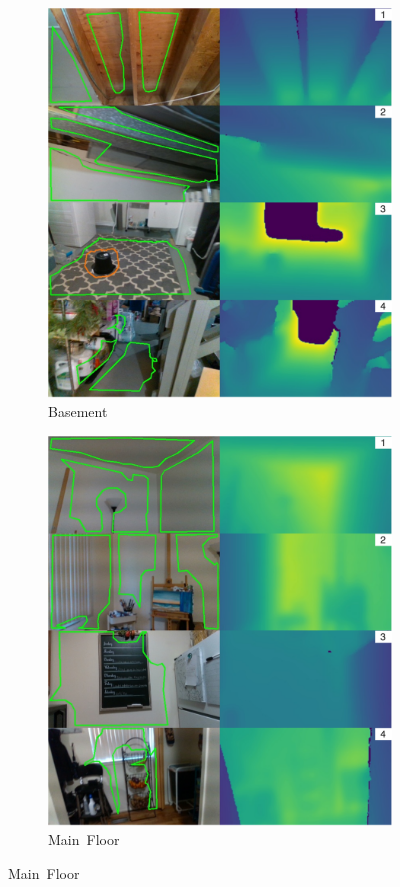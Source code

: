 \begin{figure}[ht]

  \begin{subfigure}[t]{.48\linewidth}
    \centering
    \includegraphics[width=.8\linewidth]{chapter_3_polylidar3d/imgs/realsense/rgbd_polylidar3d-Basement_v1.pdf}
    \caption{Basement}
    \label{fig:ch3_rgbd_basement}
  \end{subfigure}
  \hfill
  \begin{subfigure}[t]{.48\linewidth}
    \centering
    \includegraphics[width=.8\linewidth]{chapter_3_polylidar3d/imgs/realsense/rgbd_polylidar3d-MainFloor_v1.pdf}
    \caption{Main~Floor}
    \label{fig:ch3_rgbd_main_floor}
  \end{subfigure}


\end{figure}
